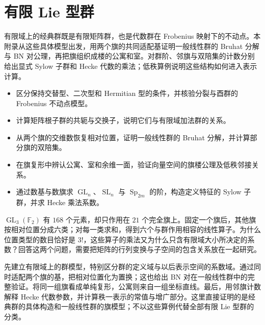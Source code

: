 
\chapter{有限 Lie 型群}
\label{b5:app:F}

\begin{chapterabstract}
	有限域上的经典群既是有限矩阵群，也是代数群在 Frobenius 映射下的不动点。本附录从这些具体模型出发，用两个旗的共同适配基证明一般线性群的 Bruhat 分解与 BN 对公理，再把旗组织成楼的公寓和室。对群阶、邻旗与双陪集的计数分别给出显式 Sylow 子群和 Hecke 代数的乘法；低秩算例说明这些结构如何进入表示计算。
\end{chapterabstract}

\begin{learninggoals}
	\begin{itemize}
		\item 区分保持交替型、二次型和 Hermitian 型的条件，并核验分裂与酉群的 Frobenius 不动点模型。
		\item 计算矩阵根子群的共轭与交换子，说明它们与有限域加法群的关系。
		\item 从两个旗的交维数恢复相对位置，证明一般线性群的 Bruhat 分解，并计算部分旗的双陪集。
		\item 在旗复形中辨认公寓、室和余维一面，验证向量空间的旗楼公理及低秩邻接关系。
		\item 通过数基与数旗求 \(\operatorname{GL}_n\)、\(\operatorname{SL}_n\) 与 \(\operatorname{Sp}_{2m}\) 的阶，构造定义特征的 Sylow 子群，并求 Hecke 乘法系数。
	\end{itemize}
\end{learninggoals}

\(\operatorname{GL}_3(\mathbb F_2)\) 有 \(168\) 个元素，却只作用在 \(21\) 个完全旗上。固定一个旗后，其他旗按相对位置分成六类；对每一类求和，得到六个与群作用相容的线性算子。为什么位置类型的数目恰好是 \(3!\)，这些算子的乘法又为什么只含有限域大小所决定的系数？回答这两个问题，需要把矩阵的行列变换与子空间的包含关系放在一起研究。

\ProseParagraphBreak
{}先建立有限域上的群模型，特别区分群的定义域与以后表示空间的系数域。通过同时适配两个旗的基，把相对位置化为置换；这也给出 BN 对在一般线性群中的完整验证。将同一组旗看成单纯复形，公寓则来自一组坐标直线。最后，用邻旗计数解释 Hecke 代数参数，并计算秩一表示的常值与增广部分。这里直接证明的是经典群的具体构造和一般线性群的旗模型；不以这些算例代替全部有限 Lie 型群的分类。

